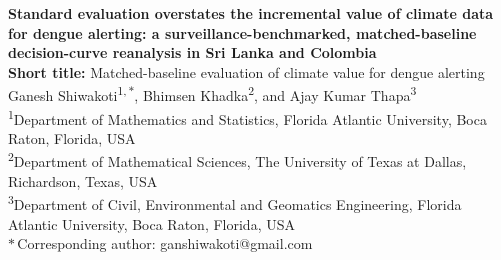 \documentclass[11pt,a4paper]{article}
\begin{document}
\thispagestyle{fancy}
\begin{center}
{\Large \textbf{Standard evaluation overstates the incremental value of climate data for dengue alerting: a surveillance-benchmarked, matched-baseline decision-curve reanalysis in Sri Lanka and Colombia}}\\[1.0em]

{\normalsize \textbf{Short title:} Matched-baseline evaluation of climate value for dengue alerting}\\[1.2em]

Ganesh Shiwakoti\textsuperscript{1,\,$\ast$}, Bhimsen Khadka\textsuperscript{2}, and Ajay Kumar Thapa\textsuperscript{3}\\[0.6em]

\footnotesize
\textsuperscript{1}Department of Mathematics and Statistics, Florida Atlantic University, Boca Raton, Florida, USA\\
\textsuperscript{2}Department of Mathematical Sciences, The University of Texas at Dallas, Richardson, Texas, USA\\
\textsuperscript{3}Department of Civil, Environmental and Geomatics Engineering, Florida Atlantic University, Boca Raton, Florida, USA\\[0.3em]
$\ast$\,Corresponding author: ganshiwakoti@gmail.com
\end{center}

\vspace{1em}
\begin{center}
\ifdefined\internalcompletion
{}
\else
{}
\fi
\end{center}

\newpage
\end{document}

